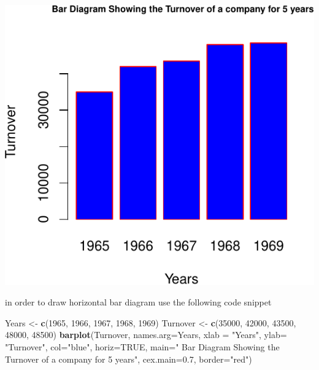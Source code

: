 \documentclass[]{article}
\newenvironment{Shaded}{\begin{snugshade}}{\end{snugshade}}
\newcommand{\DataTypeTok}[1]{\textcolor[rgb]{0.13,0.29,0.53}{#1}}
\newcommand{\DecValTok}[1]{\textcolor[rgb]{0.00,0.00,0.81}{#1}}
\newcommand{\FloatTok}[1]{\textcolor[rgb]{0.00,0.00,0.81}{#1}}
\newcommand{\KeywordTok}[1]{\textcolor[rgb]{0.13,0.29,0.53}{\textbf{#1}}}
\newcommand{\NormalTok}[1]{#1}
\newcommand{\OtherTok}[1]{\textcolor[rgb]{0.56,0.35,0.01}{#1}}
\newcommand{\StringTok}[1]{\textcolor[rgb]{0.31,0.60,0.02}{#1}}
\begin{document}
\includegraphics{chapt2_files/figure-latex/Simple bar chart-1.pdf}

in order to draw horizontal bar diagram use the following code snippet

\begin{Shaded}
\begin{Highlighting}[]
\NormalTok{Years \textless{}{-}}\StringTok{ }\KeywordTok{c}\NormalTok{(}\DecValTok{1965}\NormalTok{, }\DecValTok{1966}\NormalTok{, }\DecValTok{1967}\NormalTok{, }\DecValTok{1968}\NormalTok{, }\DecValTok{1969}\NormalTok{)}
\NormalTok{Turnover \textless{}{-}}\StringTok{ }\KeywordTok{c}\NormalTok{(}\DecValTok{35000}\NormalTok{, }\DecValTok{42000}\NormalTok{, }\DecValTok{43500}\NormalTok{, }\DecValTok{48000}\NormalTok{, }\DecValTok{48500}\NormalTok{)}
\KeywordTok{barplot}\NormalTok{(Turnover, }\DataTypeTok{names.arg=}\NormalTok{Years, }\DataTypeTok{xlab =} \StringTok{"Years"}\NormalTok{, }\DataTypeTok{ylab=} \StringTok{"Turnover"}\NormalTok{,}
                \DataTypeTok{col=}\StringTok{"blue"}\NormalTok{,  }
                \DataTypeTok{horiz=}\OtherTok{TRUE}\NormalTok{,  }
                \DataTypeTok{main=}\StringTok{" Bar Diagram Showing the Turnover of a company for 5 years"}\NormalTok{,  }
                \DataTypeTok{cex.main=}\FloatTok{0.7}\NormalTok{,}
                \DataTypeTok{border=}\StringTok{"red"}\NormalTok{)}
\end{Highlighting}
\end{Shaded}
\end{document}
